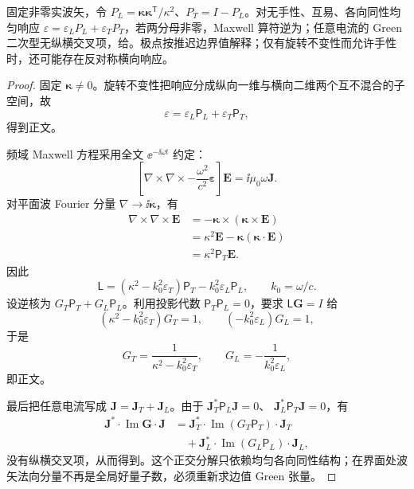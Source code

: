 \begin{proposition}
固定非零实波矢，令 $P_L=\boldsymbol\kappa\boldsymbol\kappa^{\mathsf T}/\kappa^2$、$P_T=I-P_L$。对无手性、互易、各向同性均匀响应 $\varepsilon=\varepsilon_LP_L+\varepsilon_TP_T$，若两分母非零，Maxwell 算符逆为；任意电流的 Green 二次型无纵横交叉项，给。极点按推迟边界值解释；仅有旋转不变性而允许手性时，还可能存在反对称横向响应。
\end{proposition}
\begin{proof}
固定 $\boldsymbol\kappa\neq0$。旋转不变性把响应分成纵向一维与横向二维两个互不混合的子空间，故
\[
\varepsilon
=\varepsilon_L\mathsf P_L+\varepsilon_T\mathsf P_T,
\]
得到正文。

频域 Maxwell 方程采用全文 $\ee^{-\ii\omega t}$ 约定：
\[
\left[
\nabla\times\nabla\times
-\frac{\omega^2}{c^2}\boldsymbol\varepsilon
\right]\mathbf E
=\ii\mu_0\omega\mathbf J.
\]
对平面波 Fourier 分量 $\nabla\to\ii\boldsymbol\kappa$，有
\begin{align*}
\nabla\times\nabla\times\mathbf E
&=-\boldsymbol\kappa\times
(\boldsymbol\kappa\times\mathbf E)\\
&=\kappa^2\mathbf E
-\boldsymbol\kappa(\boldsymbol\kappa\cdot\mathbf E)\\
&=\kappa^2\mathsf P_T\mathbf E.
\end{align*}
因此
\[
\mathsf L
=\left(\kappa^2-k_0^2\varepsilon_T\right)\mathsf P_T
-k_0^2\varepsilon_L\mathsf P_L,
\qquad k_0=\omega/c.
\]
设逆核为 $G_T\mathsf P_T+G_L\mathsf P_L$。利用投影代数
$\mathsf P_T\mathsf P_L=0$，要求 $\mathsf L\mathbf G=I$ 给
\[
(\kappa^2-k_0^2\varepsilon_T)G_T=1,
\qquad
(-k_0^2\varepsilon_L)G_L=1,
\]
于是
\[
G_T=\frac1{\kappa^2-k_0^2\varepsilon_T},
\qquad
G_L=-\frac1{k_0^2\varepsilon_L},
\]
即正文。

最后把任意电流写成
$\mathbf J=\mathbf J_T+\mathbf J_L$。由于
$\mathbf J_T^*\mathsf P_L\mathbf J=0$、
$\mathbf J_L^*\mathsf P_T\mathbf J=0$，有
\begin{align*}
\mathbf J^*\cdot\operatorname{Im}\mathbf G\cdot\mathbf J
&=\mathbf J_T^*\cdot
\operatorname{Im}(G_T\mathsf P_T)\cdot\mathbf J_T\\
&\quad+\mathbf J_L^*\cdot
\operatorname{Im}(G_L\mathsf P_L)\cdot\mathbf J_L,
\end{align*}
没有纵横交叉项，从而得到。这个正交分解只依赖均匀各向同性结构；在界面处波矢法向分量不再是全局好量子数，必须重新求边值 Green 张量。
\end{proof}


